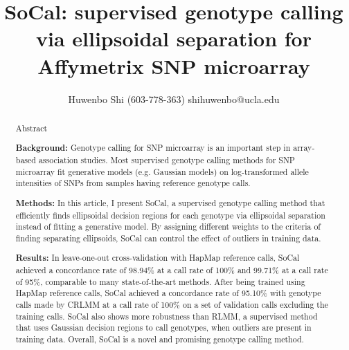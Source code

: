 \documentclass{scrartcl}
\begin{document}

\newcommand*{\TitleFont}{
      \usefont{\encodingdefault}{\rmdefault}{b}{n}
      \fontsize{16}{20}
      \selectfont}
\newcommand*{\AuthorFont}{
      \usefont{\encodingdefault}{\rmdefault}{r}{n}
      \fontsize{12}{20}
      \selectfont}
\title{\TitleFont SoCal: supervised genotype calling via ellipsoidal
separation for Affymetrix SNP microarray}
\author{\AuthorFont Huwenbo Shi (603-778-363) shihuwenbo@ucla.edu}
\date{}
\maketitle





\begin{abstract}

\centerline{Abstract}

\vspace*{\baselineskip}

\par
\noindent
\textbf{Background:} Genotype calling for SNP microarray is an important
step in array-based association studies.
Most supervised genotype calling methods for SNP microarray fit
generative models (e.g. Gaussian models) on log-transformed allele intensities
of SNPs from samples having reference genotype calls.

\par
\noindent
\textbf{Methods:} In this article, I present SoCal, a supervised genotype
calling method that efficiently finds ellipsoidal decision regions for each
genotype via ellipsoidal separation instead of fitting a generative model.
By assigning different weights to the criteria of finding separating
ellipsoids, SoCal can control the effect of outliers in training data.

\par
\noindent
\textbf{Results:} In leave-one-out cross-validation with HapMap reference
calls, SoCal achieved a concordance rate of 98.94\% at a call rate of 100\%
and 99.71\% at a call rate of 95\%, comparable to many
state-of-the-art methods.
After being trained using HapMap reference calls, SoCal achieved a concordance
rate of 95.10\% with genotype calls made by CRLMM at a call rate of
100\% on a set of validation calls excluding the training calls.
SoCal also shows more robustness than RLMM, a supervised method that uses
Gaussian decision regions to call genotypes, when outliers are present in
training data.
Overall, SoCal is a novel and promising genotype calling method.

\end{abstract}
\end{document}
